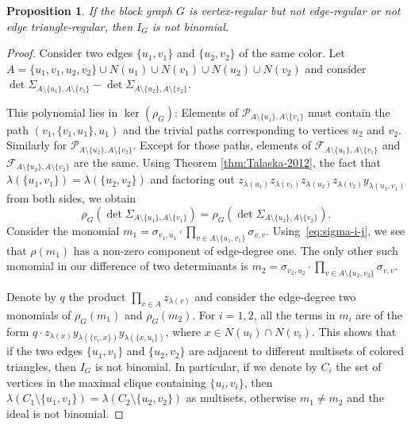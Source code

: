 \documentclass[a4paper, 11pt]{amsart}
\numberwithin{theorem}{section}
\newtheorem{proposition}[theorem]{Proposition}
\def\P{{\mathcal P}}
\def\F{{\mathcal F}}
\begin{document}
\begin{proposition}\label{prop:edge-transitivity}
    If the block graph $G$ is vertex-regular but not edge-regular or not edge
    triangle-regular, then $I_G$ is not binomial.
\end{proposition}
\begin{proof}
    Consider two edges $\{u_1,v_1\}$ and $\{u_2,v_2\}$ of the same color. Let $A = \lbrace u_1, v_1, u_2,v_2\rbrace \cup N(u_1)\cup N(v_1)\cup N(u_2)\cup N(v_2)$ 
    and consider $\det\Sigma_{A\setminus\lbrace u_1\rbrace, A\setminus\lbrace v_1\rbrace} - \det\Sigma_{A\setminus\lbrace u_2\rbrace,A\setminus\lbrace v_2\rbrace}$.

    This polynomial lies in $\ker(\rho_G)$: Elements of $\P_{A\setminus\lbrace u_1\rbrace,A\setminus\lbrace v_1\rbrace}$ must contain the path $(v_1,\{v_1,u_1\},u_1)$ and the trivial paths corresponding to vertices $u_2$ and $v_2$. Similarly for $\P_{A\setminus\lbrace u_2\rbrace,A\setminus\lbrace v_2\rbrace}$. Except for those paths, elements of $\F_{A\setminus\lbrace u_1\rbrace,A\setminus\lbrace v_1\rbrace}$ and $\F_{A\setminus\lbrace u_2\rbrace,A\setminus\lbrace v_2\rbrace}$ are the same. Using Theorem \ref{thm:Talaska-2012}, the fact that $\lambda(\{u_1,v_1\}) = \lambda(\{u_2,v_2\})$ and factoring out $z_{\lambda(u_1)}z_{\lambda(v_1)}z_{\lambda(u_2)}z_{\lambda
    (v_2)}y_{\lambda(u_1,v_1)}$ from both sides, we obtain
    $$
        \rho_G(\det\Sigma_{A\setminus\lbrace u_1\rbrace,
	A\setminus\lbrace v_1\rbrace}) =
	\rho_G(\det\Sigma_{A\setminus\lbrace
	u_2\rbrace,A\setminus\lbrace v_2\rbrace}).
    $$
    Consider the monomial $m_1 = \sigma_{v_1,u_1}\cdot \prod_{v\in
    A\setminus \lbrace u_1, v_1\rbrace} \sigma_{v,v}$.
    Using~\eqref{eq:sigma-i-j}, we see that $\rho(m_1)$ has a non-zero
    component of edge-degree one. The only other such monomial in our
    difference of two determinants is $m_2 = \sigma_{v_2,u_2}\cdot \prod_{v\in A\setminus \lbrace u_2, v_2\rbrace} \sigma_{v,v}$.

    Denote by $q$ the product $\prod_{v\in A} z_{\lambda(v)}$ and
    consider the edge-degree two monomials of $\rho_G(m_1)$ and
    $\rho_G(m_2)$. For $i =1,2$, all the
    terms in $m_i$ are of the form $q\cdot z_{\lambda(x)}
    y_{\lambda(\{v_i,x\})} y_{\lambda(\{x,u_i\})}$, where $x\in N(u_i)\cap
    N(v_i)$. This shows that if the two edges $\{u_1,v_1\}$ and
    $\{u_2,v_2\}$ are adjacent to
    different multisets of colored triangles, then $I_G$ is not binomial. In
    particular, if we denote by $C_i$ the set of vertices in the
    maximal clique containing $\{u_i,v_i\}$, then
    $\lambda(C_1\setminus\lbrace u_1,v_1\rbrace) =
    \lambda(C_2\setminus\lbrace u_2,v_2\rbrace)$ as multisets,
    otherwise $m_1\neq m_2$ and the ideal is not binomial.


\end{proof}
\end{document}
